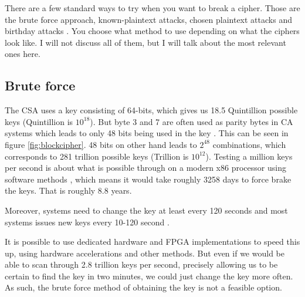 There are a few standard ways to try when you want to break a cipher. 
Those are the brute force approach, known-plaintext attacks, chosen plaintext 
attacks and birthday attacks \citep[pp. 31-34]{Schneier:2003}. You choose what 
method to use depending on what the ciphers look like. I will not discuss all 
of them, but I will talk about the most relevant ones here.

\subsection{Brute force}
The CSA uses a key consisting of 64-bits, which gives us 18.5 Quintillion 
possible keys (Quintillion is $10^{18}$). But byte 3 and 7 are often used as 
parity bytes in CA systems which leads to only 48 bits being used in the key 
\citep{Breaking:2012}. This can be seen in figure \ref{fig:blockcipher}. 48 bits 
on other hand leads to $2^{48}$ combinations, which corresponds to 281 trillion 
possible keys (Trillion is $10^{12}$). Testing a million keys per second is about 
what is possible through on a modern x86 processor using software methods
, which means it would take roughly 
3258 days to force brake the keys. That is roughly 8.8 years.

Moreover, systems need to change the key at least every 120 seconds \citep{Simpson:2009} and most systems issues new keys every 10-120 second \citep{Wirt:2004}.

It is possible to use dedicated hardware and FPGA implementations to speed this 
up, using hardware accelerations and other methods. But even if we would be able 
to scan through 2.8 trillion keys per second, precisely allowing us to be certain
to find the key in two minutes, we could just change the key more often. As such,
the brute force method of obtaining the key is not a feasible option.



